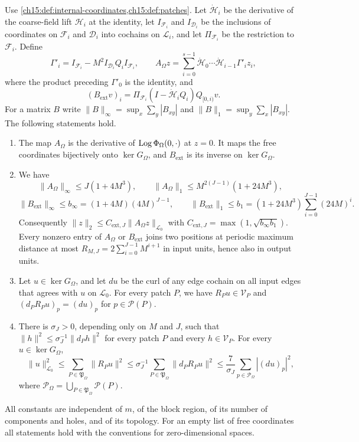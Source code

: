 \begin{lemma}\label{ch15:lem:patch-coercivity}
Use \cref{ch15:def:internal-coordinates,ch15:def:patches}. Let $\dot{\mathcal H}_i$ be the derivative of the coarse-field lift $\mathcal H_i$ at the identity, let $I_{\mathcal F_i}$ and $I_{\mathcal D_i}$ be the inclusions of coordinates on $\mathcal F_i$ and $\mathcal D_i$ into cochains on $\mathcal L_i$, and let $\Pi_{\mathcal F_i}$ be the restriction to $\mathcal F_i$. Define
\begin{equation}\label{ch15:eq:raw-embedding}
 \Gamma'_i=I_{\mathcal F_i}-M^2I_{\mathcal D_i}Q_iI_{\mathcal F_i},\qquad
 A_\Omega z=\sum_{i=0}^{s-1}\dot{\mathcal H}_0\cdots\dot{\mathcal H}_{i-1}\Gamma'_i z_i,
\end{equation}
where the product preceding $\Gamma'_0$ is the identity, and
\begin{equation}\label{ch15:eq:extraction}
 (B_{\mathrm{ext}}v)_i=
 \Pi_{\mathcal F_i}(I-\dot{\mathcal H}_iQ_i)Q_{[0,i)}v .
\end{equation}
For a matrix $B$ write $\|B\|_\infty=\sup_x\sum_y|B_{xy}|$ and $\|B\|_1=\sup_y\sum_x|B_{xy}|$. The following statements hold.
\begin{enumerate}
\item The map $A_\Omega$ is the derivative of $\operatorname{Log}\Phi_\Omega(0,\cdot)$ at $z=0$. It maps the free coordinates bijectively onto $\ker G_\Omega$, and $B_{\mathrm{ext}}$ is its inverse on $\ker G_\Omega$.
\item We have
\[
 \|A_\Omega\|_\infty\le J(1+4M^3),\qquad
 \|A_\Omega\|_1\le M^{2(J-1)}(1+24M^3),
\]
\[
 \|B_{\mathrm{ext}}\|_\infty\le b_\infty=(1+4M)(4M)^{J-1},\qquad
 \|B_{\mathrm{ext}}\|_1\le b_1=(1+24M^3)\sum_{i=0}^{J-1}(24M)^i .
\]
Consequently $\|z\|_2\le C_{\mathrm{ext},J}\|A_\Omega z\|_{\mathcal L_0}$ with $C_{\mathrm{ext},J}=\max(1,\sqrt{b_\infty b_1})$. Every nonzero entry of $A_\Omega$ or $B_{\mathrm{ext}}$ joins two positions at periodic maximum distance at most $R_{M,J}=2\sum_{i=0}^{J-1}M^{i+1}$ in input units, hence also in output units.
\item Let $u\in\ker G_\Omega$, and let $du$ be the curl of any edge cochain on all input edges that agrees with $u$ on $\mathcal L_0$. For every patch $P$, we have $R_Pu\in\mathcal V_P$ and $(d_PR_Pu)_p=(du)_p$ for $p\in\mathcal P(P)$.
\item There is $\sigma_J>0$, depending only on $M$ and $J$, such that $\|h\|^2\le\sigma_J^{-1}\|d_Ph\|^2$ for every patch $P$ and every $h\in\mathcal V_P$. For every $u\in\ker G_\Omega$,
\begin{equation}\label{ch15:eq:patch-inequality}
 \|u\|_{\mathcal L_0}^2\le\sum_{P\in\mathfrak P_\Omega}\|R_Pu\|^2
 \le\sigma_J^{-1}\sum_{P\in\mathfrak P_\Omega}\|d_PR_Pu\|^2
 \le\frac{7}{\sigma_J}\sum_{p\in\mathcal P_\Omega}|(du)_p|^2,
\end{equation}
where $\mathcal P_\Omega=\bigcup_{P\in\mathfrak P_\Omega}\mathcal P(P)$.
\end{enumerate}
All constants are independent of $m$, of the block region, of its number of components and holes, and of its topology. For an empty list of free coordinates all statements hold with the conventions for zero-dimensional spaces.
\end{lemma}

